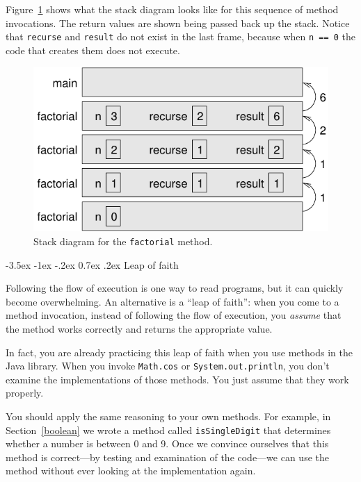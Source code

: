\documentclass[12pt]{book}
\makeatletter
\theoremstyle{exercise}
\newcommand{\java}[1]{\verb"#1"}
\renewcommand{\section}{\@startsection{section}{1}{\z@}%
    {-3.5ex \@plus -1ex \@minus -.2ex}%
    {0.7ex \@plus.2ex}%
    {\normalfont\Large\bfseries}}
\newcommand{\java}[1]{\lstinline{#1}} %
\makeatother
\begin{document}
Figure~\ref{fig:stack3} shows what the stack diagram looks like for this sequence of method invocations.
The return values are shown being passed back up the stack.
Notice that \java{recurse} and \java{result} do not exist in the last frame, because when \java{n == 0} the code that creates them does not execute.

\begin{figure}[!h]
\begin{center}
\includegraphics{figs/stack3.pdf}
\caption{Stack diagram for the \java{factorial} method.}
\label{fig:stack3}
\end{center}
\end{figure}


\section{Leap of faith}
\label{leap of faith}


Following the flow of execution is one way to read programs, but it can quickly become overwhelming.
An alternative is a ``leap of faith'':
when you come to a method invocation, instead of following the flow of execution, you {\em assume} that the method works correctly and returns the appropriate value.

In fact, you are already practicing this leap of faith when you use methods in the Java library.
When you invoke \java{Math.cos} or \java{System.out.println}, you don't examine the implementations of those methods.
You just assume that they work properly.

You should apply the same reasoning to your own methods.
For example, in Section~\ref{boolean} we wrote a method called \java{isSingleDigit} that determines whether a number is between 0 and 9.
Once we convince ourselves that this method is correct---by testing and examination of the code---we can use the method without ever looking at the implementation again.
\end{document}
